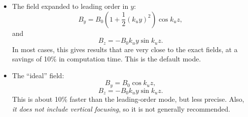 \begin{itemize}
\item The field expanded to leading order in $y$:
\begin{equation}
B_y = B_0 ( 1 + \frac{1}{2}(k_u y)^2 ) \cos k_u z,
\end{equation}
and
\begin{equation}
B_z = -B_0 k_u y \sin k_u z.
\end{equation}
In most cases, this gives results that are very close to the exact fields,
at a savings of 10\% in computation time.
This is the default mode.

\item The ``ideal'' field:
\begin{equation}
B_y = B_0 \cos k_u z,
\end{equation}
\begin{equation}
B_z = -B_0 k_u y \sin k_u z.
\end{equation}
This is about 10\% faster than the leading-order mode, but less
precise.  Also, {\em it does not include vertical focusing}, so it is
not generally recommended.
\end{itemize}

